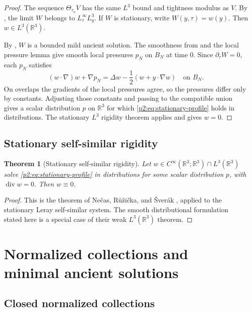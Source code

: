 \documentclass[11pt]{amsart}
\theoremstyle{plain}
\newtheorem{theorem}{Theorem}[section]
\theoremstyle{definition}
\theoremstyle{remark}
\numberwithin{equation}{section}
\newcommand{\R}{\mathbb R}
\newcommand{\divergence}{\operatorname{div}}
\begin{document}
\begin{proof}
The sequence \(\Theta_{\tau_n}V\) has the same \(L^3\) bound and tightness
modulus as \(V\).  By , the limit \(W\) belongs to
\(L^\infty_\tau L^3_y\).  If \(W\) is stationary, write
\(W(y,\tau)=w(y)\).  Then \(w\in L^3(\R^3)\).

By , \(W\) is a bounded mild ancient solution.  The
smoothness from  and the local pressure lemma
 give smooth local pressures \(p_N\) on \(B_N\) at
time \(0\).  Since
\(\partial_\tau W=0\), each \(p_N\) satisfies
\[
   (w\cdot\nabla)w+\nabla p_N
   =
   \Delta w-\frac12(w+y\cdot\nabla w)
   \quad\text{on }B_N .
\]
On overlaps the gradients of the local pressures agree, so the pressures
differ only by constants.  Adjusting those constants and passing to the
compatible union gives a scalar distribution \(p\) on \(\R^3\) for which
\eqref{p2:eq:stationary-profile} holds in distributions.  The stationary
\(L^3\) rigidity theorem  applies and gives \(w=0\).
\end{proof}

\subsection{Stationary self-similar rigidity}

\begin{theorem}[Stationary self-similar rigidity]\label{p2:thm:NRS}
Let \(w\in C^\infty(\R^3;\R^3)\cap L^3(\R^3)\) solve
\eqref{p2:eq:stationary-profile} in distributions for some scalar distribution
\(p\), with \(\divergence w=0\).  Then \(w\equiv0\).
\end{theorem}

\begin{proof}
This is the theorem of Ne\v{c}as, R\r{u}\v{z}i\v{c}ka, and
\v{S}ver\'ak \cite{NRS1996}, applied to the stationary Leray self-similar
system.  The smooth distributional formulation stated here is a special case
of their weak \(L^3(\R^3)\) theorem.
\end{proof}

\section{Normalized collections and minimal ancient solutions}
\label{p2:sec:minimal-elements}

\subsection{Closed normalized collections}
\end{document}
